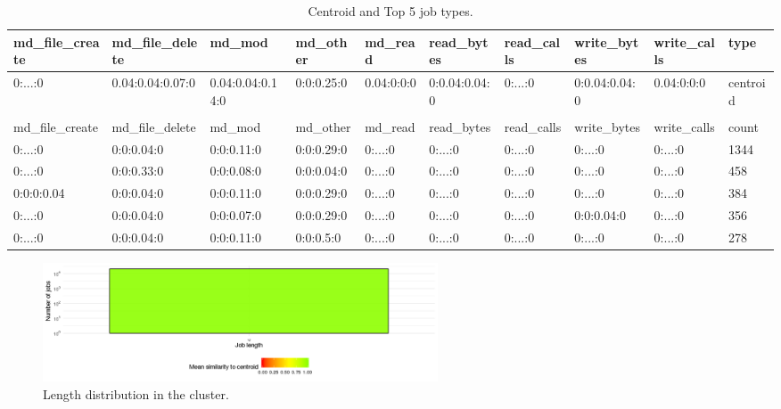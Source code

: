 \documentclass[]{llncs}
\begin{document}
\begin{table}
  \centering
  \begin{tabular}{@{ }l@{ }@{ }l@{ }@{ }l@{ }@{ }l@{ }@{ }l@{ }@{ }l@{ }@{ }l@{ }@{ }l@{ }@{ }l@{ }@{ }l@{ }}
    md\_file\_create & md\_file\_delete & md\_mod          & md\_other  & md\_read   & read\_bytes   & read\_calls & write\_bytes  & write\_calls & type\\ 
    \hline
    0:...:0          & 0.04:0.04:0.07:0 & 0.04:0.04:0.14:0 & 0:0:0.25:0 & 0.04:0:0:0 & 0:0.04:0.04:0 & 0:...:0     & 0:0.04:0.04:0 & 0.04:0:0:0   & centroid \\ 
    &                  &                  &            &            &               &             &               &              &          \\ 
    md\_file\_create & md\_file\_delete & md\_mod          & md\_other  & md\_read   & read\_bytes   & read\_calls & write\_bytes  & write\_calls & count    \\ 
    \hline
    0:...:0          & 0:0:0.04:0       & 0:0:0.11:0       & 0:0:0.29:0 & 0:...:0    & 0:...:0       & 0:...:0     & 0:...:0       & 0:...:0      & 1344     \\ 
    0:...:0          & 0:0:0.33:0       & 0:0:0.08:0       & 0:0:0.04:0 & 0:...:0    & 0:...:0       & 0:...:0     & 0:...:0       & 0:...:0      & 458      \\ 
    0:0:0:0.04       & 0:0:0.04:0       & 0:0:0.11:0       & 0:0:0.29:0 & 0:...:0    & 0:...:0       & 0:...:0     & 0:...:0       & 0:...:0      & 384      \\ 
    0:...:0          & 0:0:0.04:0       & 0:0:0.07:0       & 0:0:0.29:0 & 0:...:0    & 0:...:0       & 0:...:0     & 0:0:0.04:0    & 0:...:0      & 356      \\ 
    0:...:0          & 0:0:0.04:0       & 0:0:0.11:0       & 0:0:0.5:0  & 0:...:0    & 0:...:0       & 0:...:0     & 0:...:0       & 0:...:0      & 278      \\ 
  \end{tabular}
  \caption{Centroid and Top 5 job types.}
  \label{tab:hex_native:top_jobs}
\end{table}


\begin{figure}
  \centering
  \includegraphics[width=4.61in,height=1.39in]{./media/image8.png}
  \caption{Length distribution in the cluster.}
  \label{fig:hex_native:length}
\end{figure}
\end{document}
